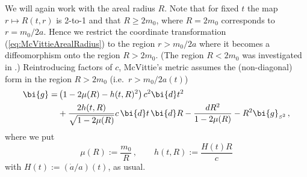 \documentclass
[rmp,aps,twocolumn,showpacs,preprintnumbers,amsmath,amssymb]{revtex4}
\theoremstyle{plain}
\theoremstyle{definition}
\theoremstyle{remark}
\newcommand{\sss}{\scriptscriptstyle}
\newcommand{\ed}{\bi{d}}                      %
\newcommand{\Stwo}{{S^2}}                         %
\newcommand{\sStwo}{{\sss \Stwo}}                 %
\newcommand{\gStwo}{\g_\sStwo}                    %
\newcommand{\g}{\bg}                            %
\newcommand{\bg}{\bi{g}}
\begin{document}
We will again work with the areal radius $R$. Note that for 
fixed $t$ the map $r\mapsto R(t,r)$ is 2-to-1 and that $R\geq 2m_0$, 
where $R=2m_0$ corresponds to $r=m_0/2a$. Hence we restrict the 
coordinate transformation (\ref{eq:McVittieArealRadius}) to the 
region $r> m_0/2a$ where it becomes a diffeomorphism onto the 
region $R> 2m_0$. (The region $R<2m_0$ was investigated in 
\cite{Nolan:1999b}.) Reintroducing factors of $c$, McVittie's 
metric assumes the (non-diagonal) form in the region $R>2m_0$ 
(i.e.~$r>m_0/2a(t)$)
%
\begin{equation}\label{eq:McVittieMetric2}
\begin{split}
\g =& \left( 1 - 2\mu(R) - h(t,R)^2  \right)c^2 \ed t^2\\
    & +\frac{2h(t,R)}{\sqrt{1-2\mu(R)}} c\,\ed t\,\ed R-\frac{dR^2}{1-2\mu(R)} 
     - R^2 \gStwo \,,
\end{split}
\end{equation}
%
where we put 
%
\begin{equation}\label{eq:Def-f-h}
  \mu(R) := \frac{m_0}{R} \,, \qquad{ } h(t,R) := \frac{H(t)R}{c} 
\end{equation}
%
with $H(t):= (\dot a/a)(t)$, as usual. 
\end{document}
